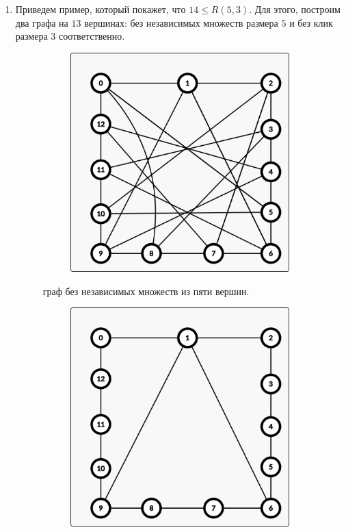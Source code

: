 \begin{solution}
\begin{enumerate}
\item Приведем пример, который покажет, что $14 \leq R(5, 3)$.
Для этого, построим два графа на $13$ вершинах: без независимых множеств размера $5$ и без клик размера $3$ соответственно.
\begin{figure}[H]
  \centering
  \begin{subfigure}[a]{0.24\linewidth}
    \includegraphics[width=\linewidth]{_img/202/01.png}
  \end{subfigure}
  \caption{граф без независимых множеств из пяти вершин.}
\end{figure}
\begin{figure}[H]
  \centering
  \begin{subfigure}[a]{0.24\linewidth}
    \includegraphics[width=\linewidth]{_img/202/02.png}

\end{subfigure}
\end{figure}
\end{enumerate}
\end{solution}
